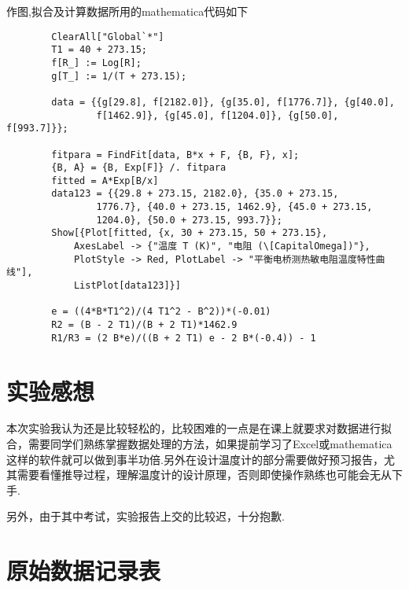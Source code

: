 \documentclass[11pt]{article}
\begin{document}
	作图,拟合及计算数据所用的mathematica代码如下
	\begin{lstlisting}
		ClearAll["Global`*"]
		T1 = 40 + 273.15;
		f[R_] := Log[R];
		g[T_] := 1/(T + 273.15);
		
		data = {{g[29.8], f[2182.0]}, {g[35.0], f[1776.7]}, {g[40.0], 
				f[1462.9]}, {g[45.0], f[1204.0]}, {g[50.0], f[993.7]}};
		
		fitpara = FindFit[data, B*x + F, {B, F}, x];
		{B, A} = {B, Exp[F]} /. fitpara
		fitted = A*Exp[B/x]
		data123 = {{29.8 + 273.15, 2182.0}, {35.0 + 273.15, 
				1776.7}, {40.0 + 273.15, 1462.9}, {45.0 + 273.15, 
				1204.0}, {50.0 + 273.15, 993.7}};
		Show[{Plot[fitted, {x, 30 + 273.15, 50 + 273.15}, 
			AxesLabel -> {"温度 T (K)", "电阻 (\[CapitalOmega])"}, 
			PlotStyle -> Red, PlotLabel -> "平衡电桥测热敏电阻温度特性曲线"], 
			ListPlot[data123]}]
		
		e = ((4*B*T1^2)/(4 T1^2 - B^2))*(-0.01)
		R2 = (B - 2 T1)/(B + 2 T1)*1462.9
		R1/R3 = (2 B*e)/((B + 2 T1) e - 2 B*(-0.4)) - 1
	\end{lstlisting}
	
	
	
	
	
	\section{实验感想}
	本次实验我认为还是比较轻松的，比较困难的一点是在课上就要求对数据进行拟合，需要同学们熟练掌握数据处理的方法，如果提前学习了Excel或mathematica这样的软件就可以做到事半功倍.另外在设计温度计的部分需要做好预习报告，尤其需要看懂推导过程，理解温度计的设计原理，否则即使操作熟练也可能会无从下手.
	
	另外，由于其中考试，实验报告上交的比较迟，十分抱歉.
	
	
	
	
	\section{原始数据记录表}
	
		
	
	
\end{document}
